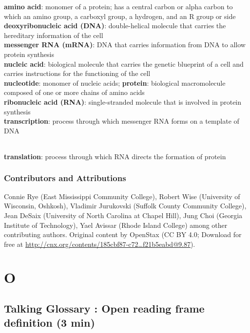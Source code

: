 \documentclass[
]{book}
\begin{document}
\textbf{amino acid}: monomer of a protein; has a central carbon or alpha
carbon to which an amino group, a carboxyl group, a hydrogen, and an R
group or side \textbf{deoxyribonucleic acid (DNA)}: double-helical molecule
that carries the hereditary information of the cell\\
\textbf{messenger RNA (mRNA)}: DNA that carries information from DNA to allow
protein synthesis\\
\textbf{nucleic acid}: biological molecule that carries the genetic blueprint
of a cell and carries instructions for the functioning of the cell\\
\textbf{nucleotide}: monomer of nucleic acids; \textbf{protein}: biological
macromolecule composed of one or more chains of amino acids\\
\textbf{ribonucleic acid (RNA)}: single-stranded
molecule that is involved in protein synthesis\\

\textbf{transcription}: process through which messenger RNA forms on a
template of DNA\\
\strut \\
\textbf{translation}: process through which RNA directs the formation of
protein

\hypertarget{contributors-and-attributions}{%
\subsection{Contributors and Attributions}\label{contributors-and-attributions}}

Connie Rye (East Mississippi Community College), Robert Wise (University
of Wisconsin, Oshkosh), Vladimir Jurukovski (Suffolk County Community
College), Jean DeSaix (University of North Carolina at Chapel Hill),
Jung Choi (Georgia Institute of Technology), Yael Avissar (Rhode Island
College) among other contributing authors. Original content by OpenStax
(CC BY 4.0; Download for free at
\href{http://cnx.org/contents/185cbf87-c72e-48f5-b51e-f14f21b5eabd\%409.87}{http://cnx.org/contents/185cbf87-c72\ldots f21b5eabd@9.87}).

\hypertarget{o}{%
\chapter{O}\label{o}}

\hypertarget{talking-glossary-open-reading-frame-definition-3-min}{%
\section{Talking Glossary : Open reading frame definition (3 min)}\label{talking-glossary-open-reading-frame-definition-3-min}}
\end{document}
